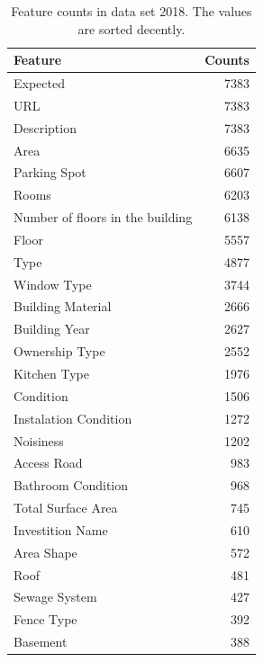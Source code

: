 \documentclass[11pt,a4paper]{article}
\begin{document}
\begin{table}[ht]
  \centering
  \caption{Feature counts in data set 2018. The values are sorted decently.}\label{table:2018_features}
  \begin{tabular}{lr}
    \toprule
    Feature &     Counts \\
    \midrule
    Expected                         &  7383 \\
    URL                              &  7383 \\
    Description                      &  7383 \\
    Area                             &  6635 \\
    Parking Spot                     &  6607 \\
    Rooms                            &  6203 \\
    Number of floors in the building &  6138 \\
    Floor                            &  5557 \\
    Type                             &  4877 \\
    Window Type                      &  3744 \\
    Building Material                &  2666 \\
    Building Year                    &  2627 \\
    Ownership Type                   &  2552 \\
    Kitchen Type                     &  1976 \\
    Condition                        &  1506 \\
    Instalation Condition            &  1272 \\
    Noisiness                        &  1202 \\
    Access Road                      &   983 \\
    Bathroom Condition               &   968 \\
    Total Surface Area               &   745 \\
    Investition Name                 &   610 \\
    Area Shape                       &   572 \\
    Roof                             &   481 \\
    Sewage System                    &   427 \\
    Fence Type                       &   392 \\
    Basement                         &   388 \\

\end{tabular}
\end{table}
\end{document}
